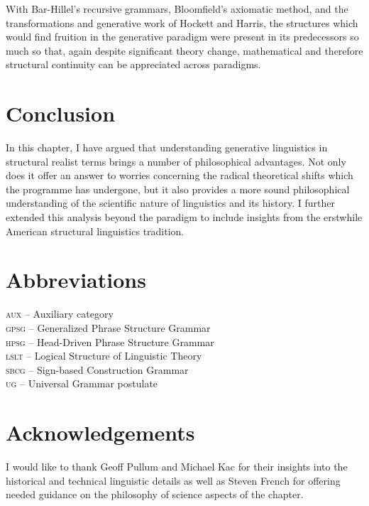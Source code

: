 \documentclass[output=paper]{langscibook}
\begin{document}
With Bar-Hillel's recursive grammars, Bloomfield's axiomatic method, and the transformations and generative work of Hockett and Harris, the structures which would find fruition in the generative paradigm were present in its predecessors so much so that, again despite significant theory change, mathematical and therefore structural continuity can be appreciated across paradigms. 

\section{Conclusion}
\label{sec:nefdt:conc}

In this chapter, I have argued that understanding generative linguistics in structural realist terms brings a number of philosophical advantages. Not only does it offer an answer to worries concerning the radical theoretical shifts which the programme has undergone, but it also provides a more sound philosophical understanding of the scientific nature of linguistics and its history. I further extended this analysis beyond the paradigm to include insights from the erstwhile American structural linguistics tradition. 

\section*{Abbreviations}
\label{sec:nefdt:abbr}

\textsc{aux} -- Auxiliary category
\\\textsc{gpsg} -- Generalized Phrase Structure Grammar
\\\textsc{hpsg} -- Head-Driven Phrase Structure Grammar
\\\textsc{lslt} -- Logical Structure of Linguistic Theory
\\\textsc{sbcg} -- Sign-based Construction Grammar
\\\textsc{ug} -- Universal Grammar postulate

\section*{Acknowledgements}
\label{sec:nefdt:ackn}

 I would like to thank Geoff Pullum and Michael Kac for their insights into the historical and technical linguistic details as well as Steven French for offering needed guidance on the philosophy of science aspects of the chapter.


{\sloppy
\printbibliography[heading=subbibliography,notkeyword=this]
  
}
\end{document}
